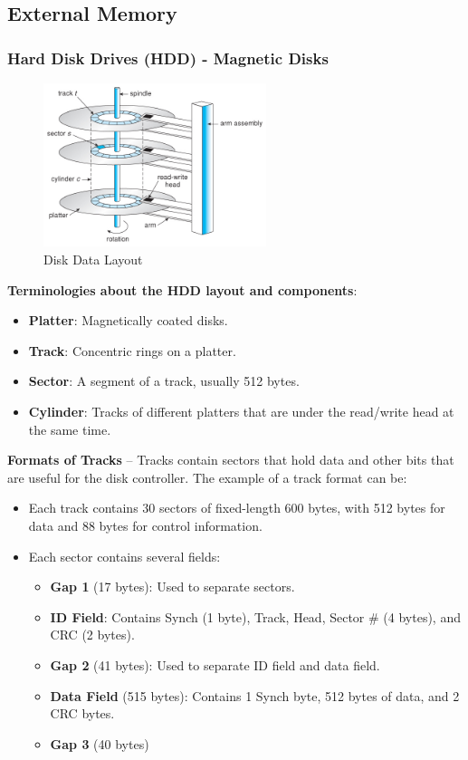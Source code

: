 \subsection{External Memory}

\subsubsection{Hard Disk Drives (HDD) - Magnetic Disks}

\begin{figure}[H]
    \centering
    \includegraphics[width=0.58\textwidth]{chaps/memory/external-memory/hdd-layout.jpg}
    \caption{Disk Data Layout}
\end{figure}

\textbf{Terminologies about the HDD layout and components}:
\begin{itemize}
    \item \textbf{Platter}: Magnetically coated disks.
    \item \textbf{Track}: Concentric rings on a platter.
    \item \textbf{Sector}: A segment of a track, usually 512 bytes.
    \item \textbf{Cylinder}: Tracks of different platters that are under the read/write head
        at the same time.
\end{itemize}

\textbf{Formats of Tracks} -- Tracks contain sectors that hold data and other bits that
are useful for the disk controller. The example of a track format can be:
\begin{itemize}
    \item Each track contains 30 sectors of fixed-length 600 bytes, with 512 bytes for data
        and 88 bytes for control information.
    \item Each sector contains several fields: \begin{itemize}
        \item \textbf{Gap 1} (17 bytes): Used to separate sectors.
        \item \textbf{ID Field}: Contains Synch (1 byte), Track, Head, Sector \# (4 bytes),
            and CRC (2 bytes).
        \item \textbf{Gap 2} (41 bytes): Used to separate ID field and data field.
        \item \textbf{Data Field} (515 bytes): Contains 1 Synch byte, 512 bytes of data, and 2
            CRC bytes.
        \item \textbf{Gap 3} (40 bytes)
    \end{itemize}
\end{itemize}

